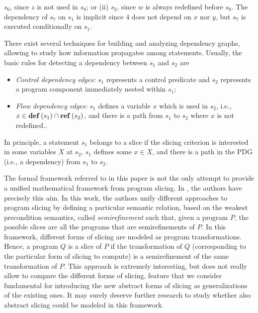 \documentclass[prodmode,acmtocl]{acmsmall}
\def\prog{\ensuremath{P}\xspace}
\def\progq{\ensuremath{Q}\xspace}
\newcommand{\0}{\mbox{\bf 0}}
\newcommand{\REFSET}[1]{{\bf ref}\left(#1\right)}
\newcommand{\DEFSET}[1]{{\bf def}\left(#1\right)}
\begin{document}
{\begin{example}
    $s_6$, since $z$ is not used in $s_8$; or (ii) $s_2$, since $w$ is
    always redefined before $s_8$.  The dependency of $s_7$ on $s_1$
    is implicit since $4$ does not depend on $x$ nor $y$, but $s_7$ is
    executed conditionally on $s_1$.
  \end{example}
  There exist several techniques for building and analyzing
  dependency graphs, allowing to study how information propagates
  among statements.  Usually, the basic rules for detecting a
  dependency between $s_{1}$ and $s_{2}$ are
\begin{itemize}
\item \emph{Control dependency edges:} $s_{1}$ represents a control
  predicate and $s_{2}$ represents a program component immediately
  nested within $s_{1}$;
\item \emph{Flow dependency edges:} $s_{1}$ defines a variable $x$
  which is used in $s_{2}$, i.e., $x \in
  \DEFSET{s_1}\cap\REFSET{s_{2}}$, and there is a path from $s_{1}$ to
  $s_{2}$ where $x$ is not redefined..
\end{itemize}
In principle, a statement $s_1$ belongs to a slice if the slicing
criterion is interested in some variables $X$ at $s_2$, $s_1$ defines
some $x \in X$, and there is a path in the PDG (i.e., a dependency)
from $s_1$ to $s_2$.}

The formal framework referred to in this paper \cite{AForm} is not the
only attempt to provide a unified mathematical framework from program
slicing.  In \cite{WardZedan}, the authors have precisely this aim.
In this work, the authors unify different approaches to program
slicing by defining a particular semantic relation, based on the
weakest precondition semantics, called \emph{semirefinement} such
that, given a program $\prog$, the possible slices are all the
programs that are semirefinements of $\prog$.  In this framework,
different forms of slicing are modeled as program transformations.
Hence, a program $\progq$ is a slice of $\prog$ if the transformation
of $\progq$ (corresponding to the particular form of slicing to
compute) is a semirefinement of the same transformation of $\prog$.
This approach is extremely interesting, but does not really allow to
compare the different forms of slicing, feature that we consider
fundamental for introducing the new abstract forms of slicing as
generalizations of the existing ones.  It may surely deserve further
research to study whether also abstract slicing could be modeled in
this framework.
\end{document}
